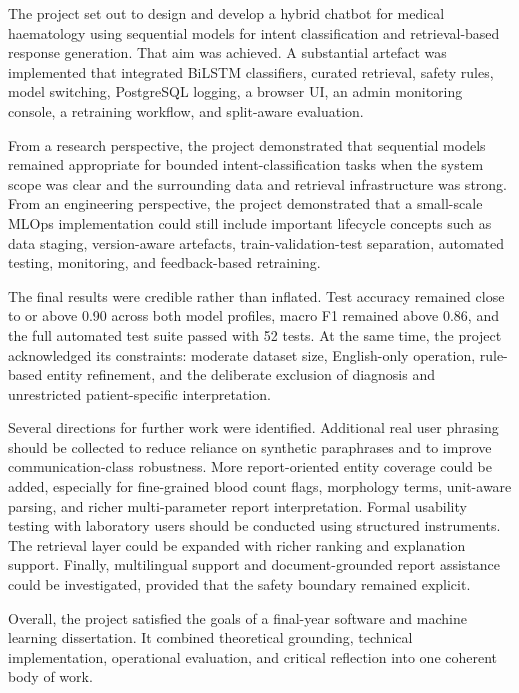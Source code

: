 The project set out to design and develop a hybrid chatbot for medical haematology using sequential models for intent classification and retrieval-based response generation. That aim was achieved. A substantial artefact was implemented that integrated BiLSTM classifiers, curated retrieval, safety rules, model switching, PostgreSQL logging, a browser UI, an admin monitoring console, a retraining workflow, and split-aware evaluation.

From a research perspective, the project demonstrated that sequential models remained appropriate for bounded intent-classification tasks when the system scope was clear and the surrounding data and retrieval infrastructure was strong. From an engineering perspective, the project demonstrated that a small-scale MLOps implementation could still include important lifecycle concepts such as data staging, version-aware artefacts, train-validation-test separation, automated testing, monitoring, and feedback-based retraining.

The final results were credible rather than inflated. Test accuracy remained close to or above 0.90 across both model profiles, macro F1 remained above 0.86, and the full automated test suite passed with 52 tests. At the same time, the project acknowledged its constraints: moderate dataset size, English-only operation, rule-based entity refinement, and the deliberate exclusion of diagnosis and unrestricted patient-specific interpretation.

Several directions for further work were identified. Additional real user phrasing should be collected to reduce reliance on synthetic paraphrases and to improve communication-class robustness. More report-oriented entity coverage could be added, especially for fine-grained blood count flags, morphology terms, unit-aware parsing, and richer multi-parameter report interpretation. Formal usability testing with laboratory users should be conducted using structured instruments. The retrieval layer could be expanded with richer ranking and explanation support. Finally, multilingual support and document-grounded report assistance could be investigated, provided that the safety boundary remained explicit.

Overall, the project satisfied the goals of a final-year software and machine learning dissertation. It combined theoretical grounding, technical implementation, operational evaluation, and critical reflection into one coherent body of work.
